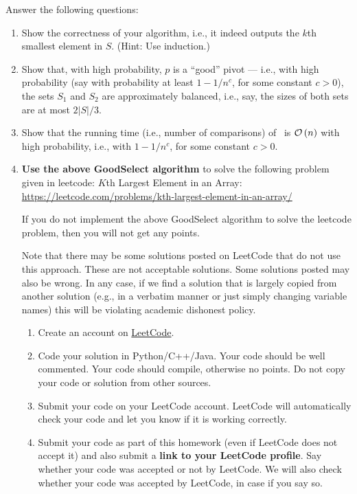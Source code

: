 \documentclass[11pt]{article}
\begin{document}
    
Answer the following questions:
    \begin{enumerate}
    \item  Show the correctness of your algorithm, i.e., it indeed outputs the $k$th smallest element in $S$.
    (Hint: Use induction.) 
        \item Show that, with high probability, $p$ is a ``good'' pivot --- i.e., with high probability (say with probability at least $1-1/n^c$, for some constant $c>0$),  the sets $S_1$ and $S_2$ are approximately balanced, i.e., say, the sizes of both sets are at most $2|S|/3$.
        \item Show that the running time (i.e., number of comparisons) of~ is $\mathcal{O}\left(n\right)$ with high probability, i.e., with  $1-1/n^c$, for some constant $c>0$.
    



\item {\bf Use the above GoodSelect algorithm} to solve the following problem given in leetcode: $K$th Largest Element in an Array: \\
\url{https://leetcode.com/problems/kth-largest-element-in-an-array/}

If you do not implement the above GoodSelect  algorithm to solve the leetcode problem, then you will not get any points.

Note that there may be some solutions posted on LeetCode that do not use this approach.  These are not acceptable solutions. Some solutions posted may also be wrong. In any case,
if we find a solution that is largely copied from another solution (e.g., in a verbatim manner or just simply changing variable names) this will be violating academic dishonest policy.


\begin{enumerate}[label=\textbf{(\alph*)}]
    
    
          \item Create an account on \href{https://leetcode.com/}{LeetCode}.   
           
    \item  Code your solution in Python/C++/Java. Your code should be well commented. Your code should compile, otherwise no points. Do not copy your code or solution from other sources.
    
          \item Submit your code on your LeetCode account. LeetCode will automatically check your code and let you know if it is working correctly.
   
    \item Submit your code as part of this homework  (even if LeetCode does not accept it) and also submit a {\bf link to your LeetCode profile}. Say whether your code was accepted or not by LeetCode. We will also check whether your code was accepted by LeetCode, in case if you say so.
\end{enumerate}

\end{enumerate}
\end{document}
